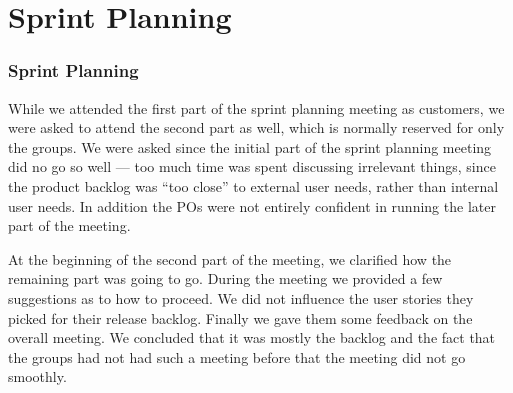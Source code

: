 \chapter{Sprint Planning}

\subsection{\db Sprint Planning}
While we attended the first part of the \db sprint planning meeting as customers, we were asked to attend the second part as well, which is normally reserved for only the \db groups. We were asked since the initial part of the sprint planning meeting did no go so well --- too much time was spent discussing irrelevant things, since the product backlog was ``too close'' to external user needs, rather than internal user needs. In addition the \db POs were not entirely confident in running the later part of the meeting.

At the beginning of the second part of the meeting, we clarified how the remaining part was going to go. During the meeting we provided a few suggestions as to how to proceed. We did not influence the user stories they picked for their release backlog. Finally we gave them some feedback on the overall meeting. We concluded that it was mostly the backlog and the fact that the \db groups had not had such a meeting before that the meeting did not go smoothly.